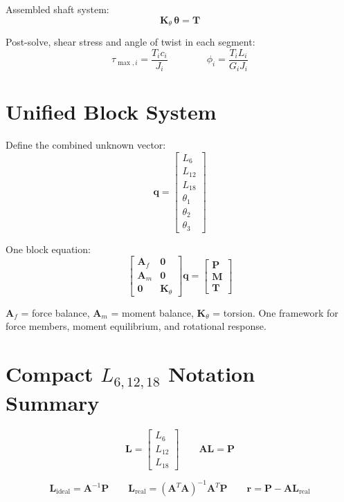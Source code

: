 \documentclass[11pt, letterpaper]{article}
\newcommand{\bL}{\mathbf{L}}
\newcommand{\bA}{\mathbf{A}}
\newcommand{\bP}{\mathbf{P}}
\newcommand{\bK}{\mathbf{K}}
\newcommand{\bq}{\mathbf{q}}
\begin{document}
Assembled shaft system:
\[
\bK_\theta\,\boldsymbol{\theta} = \mathbf{T}
\]

Post-solve, shear stress and angle of twist in each segment:
\[
\tau_{\max,i} = \frac{T_i c_i}{J_i}
\qquad\qquad
\phi_i = \frac{T_i L_i}{G_i J_i}
\]

\section{Unified Block System}

Define the combined unknown vector:
\[
\bq =
\begin{bmatrix} L_6 \\ L_{12} \\ L_{18} \\ \theta_1 \\ \theta_2 \\ \theta_3 \end{bmatrix}
\]

One block equation:
\[
\begin{bmatrix}
\bA_f & \mathbf{0} \\
\bA_m & \mathbf{0} \\
\mathbf{0} & \bK_\theta
\end{bmatrix}
\bq
=
\begin{bmatrix} \bP \\ \mathbf{M} \\ \mathbf{T} \end{bmatrix}
\]

$\bA_f$ = force balance, $\bA_m$ = moment balance, $\bK_\theta$ = torsion.
One framework for force members, moment equilibrium, and rotational response.

\section{Compact $L_{6,12,18}$ Notation Summary}

\[
\bL = \begin{bmatrix} L_6 \\ L_{12} \\ L_{18} \end{bmatrix}
\qquad
\bA\bL = \bP
\]

\[
\bL_{\mathrm{ideal}} = \bA^{-1}\bP
\qquad
\bL_{\mathrm{real}} = (\bA^T\bA)^{-1}\bA^T\bP
\qquad
\mathbf{r} = \bP - \bA\bL_{\mathrm{real}}
\]
\end{document}
